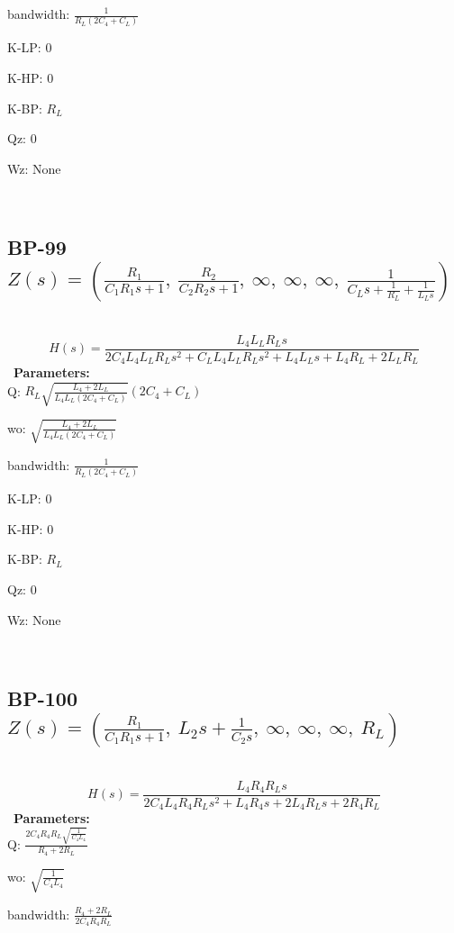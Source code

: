 \documentclass{article}
\begin{document}
bandwidth: $\frac{1}{R_{L} \left(2 C_{4} + C_{L}\right)}$\ 

K-LP: $0$\ 

K-HP: $0$\ 

K-BP: $R_{L}$\ 

Qz: $0$\ 

Wz: $\text{None}$\ 

\ 

\subsection{BP-99 $Z(s) = \left( \frac{R_{1}}{C_{1} R_{1} s + 1}, \  \frac{R_{2}}{C_{2} R_{2} s + 1}, \  \infty, \  \infty, \  \infty, \  \frac{1}{C_{L} s + \frac{1}{R_{L}} + \frac{1}{L_{L} s}}\right)$ } \ 
\textbf{\[H(s) = \frac{L_{4} L_{L} R_{L} s}{2 C_{4} L_{4} L_{L} R_{L} s^{2} + C_{L} L_{4} L_{L} R_{L} s^{2} + L_{4} L_{L} s + L_{4} R_{L} + 2 L_{L} R_{L}}\] } \ 
\textbf{Parameters:}\\ 

Q: $R_{L} \sqrt{\frac{L_{4} + 2 L_{L}}{L_{4} L_{L} \left(2 C_{4} + C_{L}\right)}} \left(2 C_{4} + C_{L}\right)$\ 

wo: $\sqrt{\frac{L_{4} + 2 L_{L}}{L_{4} L_{L} \left(2 C_{4} + C_{L}\right)}}$\ 

bandwidth: $\frac{1}{R_{L} \left(2 C_{4} + C_{L}\right)}$\ 

K-LP: $0$\ 

K-HP: $0$\ 

K-BP: $R_{L}$\ 

Qz: $0$\ 

Wz: $\text{None}$\ 

\ 

\subsection{BP-100 $Z(s) = \left( \frac{R_{1}}{C_{1} R_{1} s + 1}, \  L_{2} s + \frac{1}{C_{2} s}, \  \infty, \  \infty, \  \infty, \  R_{L}\right)$ } \ 
\textbf{\[H(s) = \frac{L_{4} R_{4} R_{L} s}{2 C_{4} L_{4} R_{4} R_{L} s^{2} + L_{4} R_{4} s + 2 L_{4} R_{L} s + 2 R_{4} R_{L}}\] } \ 
\textbf{Parameters:}\\ 

Q: $\frac{2 C_{4} R_{4} R_{L} \sqrt{\frac{1}{C_{4} L_{4}}}}{R_{4} + 2 R_{L}}$\ 

wo: $\sqrt{\frac{1}{C_{4} L_{4}}}$\ 

bandwidth: $\frac{R_{4} + 2 R_{L}}{2 C_{4} R_{4} R_{L}}$\ 
\end{document}
